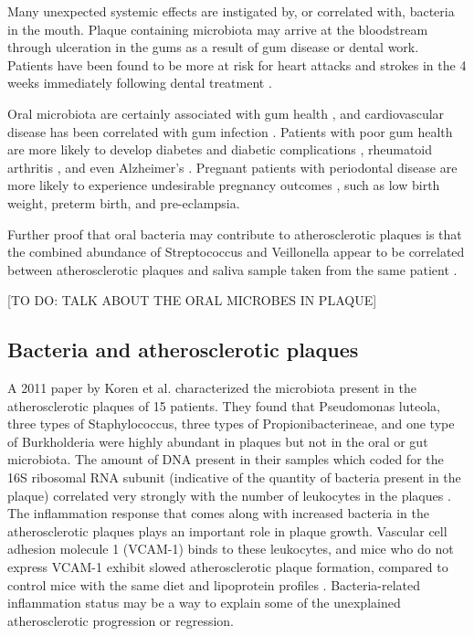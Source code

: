 Many unexpected systemic effects are instigated by, or correlated with, bacteria in the mouth. Plaque containing microbiota may arrive at the bloodstream through ulceration in the gums as a result of gum disease \cite{scannapieco2005systemic} or dental work. Patients have been found to be more at risk for heart attacks and strokes in the 4 weeks immediately following dental treatment \cite{minassian2010invasive}.

Oral microbiota are certainly associated with gum health \cite{marsh1994microbial}, and cardiovascular disease has been correlated with gum infection \cite{beck2005systemic}. Patients with poor gum health are more likely to develop diabetes and diabetic complications \cite{borgnakke2013effect}, rheumatoid arthritis \cite{scher2012periodontal}, and even Alzheimer’s \cite{kamer2008alzheimer}. Pregnant patients with periodontal disease are more likely to experience undesirable pregnancy outcomes \cite{ide2013epidemiology}, such as low birth weight, preterm birth, and pre-eclampsia.

Further proof that oral bacteria may contribute to atherosclerotic plaques is that the combined abundance of Streptococcus and Veillonella appear to be correlated between atherosclerotic plaques and saliva sample taken from the same patient \cite{koren2011human}.

[TO DO: TALK ABOUT THE ORAL MICROBES IN PLAQUE]

\subsection{Bacteria and atherosclerotic plaques}
A 2011 paper by Koren et al. characterized the microbiota present in the atherosclerotic plaques of 15 patients. They found that Pseudomonas luteola, three types of Staphylococcus, three types of Propionibacterineae, and one type of Burkholderia were highly abundant in plaques but not in the oral or gut microbiota. The amount of DNA present in their samples which coded for the 16S ribosomal RNA subunit (indicative of the quantity of bacteria present in the plaque) correlated very strongly with the number of leukocytes in the plaques \cite{koren2011human}. The inflammation response that comes along with increased bacteria in the atherosclerotic plaques plays an important role in plaque growth. Vascular cell adhesion molecule 1 (VCAM-1) binds to these leukocytes, and mice who do not express VCAM-1 exhibit slowed atherosclerotic plaque formation, compared to control mice with the same diet and lipoprotein profiles \cite{cybulsky2001major}. Bacteria-related inflammation status may be a way to explain some of the unexplained atherosclerotic progression or regression.

